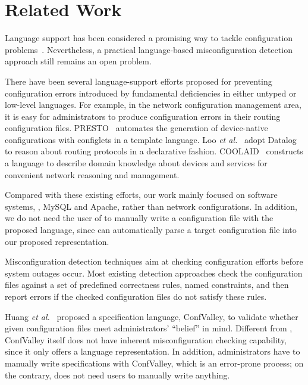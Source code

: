 
\section{Related Work}

Language support has been considered a promising way  
to tackle configuration problems~\cite{xu15systems}.
Nevertheless, a practical language-based misconfiguration
detection approach still remains an open problem.

There have been several language-support efforts proposed for preventing
configuration errors introduced by fundamental deficiencies in
either untyped or low-level languages. For example, in the network
configuration management area, it is easy for administrators to
produce configuration errors in their routing configuration files.
PRESTO~\cite{enck07configuration} 
automates the generation of device-native configurations
with configlets in a template language. 
Loo {\em et al.}~\cite{loo05declarative} adopt Datalog to reason about 
routing protocols in a declarative fashion. 
COOLAID~\cite{chen10declarative} constructs
a language to describe domain knowledge about devices and
services for convenient network reasoning and management.

Compared with these existing efforts, 
our work mainly focused on software systems, \eg, MySQL and Apache,
rather than network configurations. In addition, we do not need 
the user of \app to manually write a configuration file with the proposed
language, since \app can automatically parse a target configuration
file into our proposed representation.

Misconfiguration detection techniques aim at checking configuration
efforts before system outages occur.
Most existing detection approaches check 
the configuration files against a set of predefined correctness 
rules, named constraints, and then report errors if 
the checked configuration files do not satisfy these rules.

Huang {\em et al.}~\cite{huang15confvalley} proposed a specification 
language, ConfValley, to validate 
whether given configuration files meet administrators' 
``belief'' in mind. Different from \app, ConfValley itself does not
have inherent misconfiguration checking capability, since it only offers
a language representation. In addition, administrators have to
manually write specifications with ConfValley, which is an error-prone
process; on the contrary, \app does not need users to manually
write anything.

